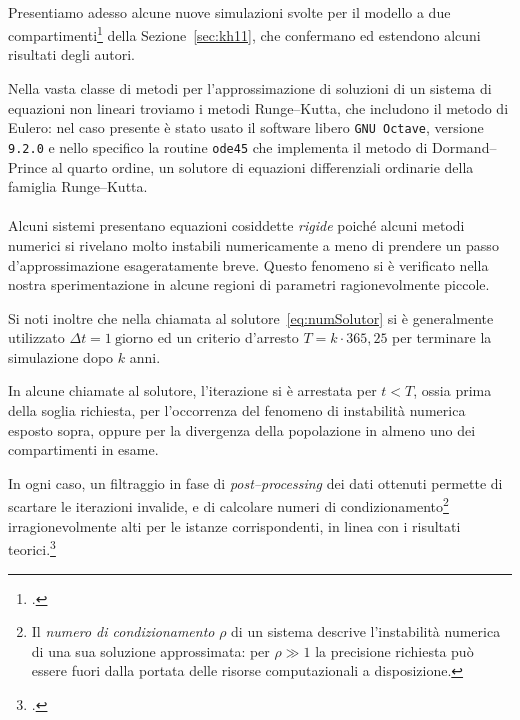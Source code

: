 \paragraph{}
Presentiamo adesso alcune nuove simulazioni svolte per il modello a due compartimenti\footcite{khoury2011}
della Sezione~\ref{sec:kh11}, che confermano ed estendono alcuni risultati degli autori.

Nella vasta classe di metodi per l'approssimazione di soluzioni di un sistema di equazioni
non lineari troviamo i metodi Runge--Kutta, che includono il metodo di Eulero:
nel caso presente è stato usato il software libero \texttt{GNU Octave}, versione \texttt{9.2.0} e nello specifico
la routine \texttt{ode45} che implementa il metodo di Dormand--Prince al quarto ordine, un solutore
di equazioni differenziali ordinarie della famiglia Runge--Kutta.

\paragraph{}
Alcuni sistemi presentano equazioni cosiddette \emph{rigide} poiché alcuni metodi numerici si rivelano
molto instabili numericamente a meno di prendere un passo d'approssimazione esageratamente breve.
Questo fenomeno si è verificato nella nostra sperimentazione in alcune regioni di parametri ragionevolmente piccole.

Si noti inoltre che nella chiamata al solutore~\eqref{eq:numSolutor} si è generalmente utilizzato $\Delta t=1~\text{giorno}$
ed un criterio d'arresto $T=k \cdot 365,25$ per terminare la simulazione dopo $k$ anni.

In alcune chiamate al solutore, l'iterazione si è arrestata per $t < T$, ossia prima della soglia richiesta, per
l'occorrenza del fenomeno di instabilità numerica esposto sopra, oppure per la divergenza della popolazione in almeno
uno dei compartimenti in esame.

In ogni caso, un filtraggio in fase di \emph{post--processing} dei dati ottenuti permette di scartare le iterazioni
invalide, e di calcolare numeri di condizionamento\footnote{Il \emph{numero di condizionamento} $\rho$ di un sistema
descrive l'instabilità numerica di una sua soluzione approssimata: per $\rho \gg 1$ la precisione richiesta può essere
fuori dalla portata delle risorse computazionali a disposizione.}
irragionevolmente alti per le istanze corrispondenti, in linea con i risultati teorici.\footcite{demmel}






